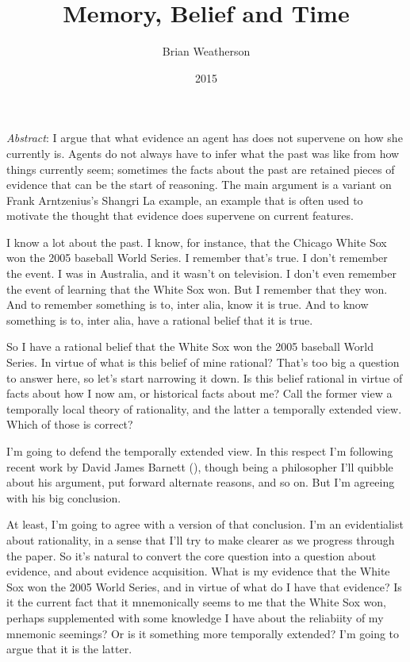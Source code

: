 \documentclass[
  11pt,
  letterpaper,
  DIV=11,
  numbers=noendperiod,
  twoside]{scrartcl}
\title{Memory, Belief and Time}
\author{Brian Weatherson}
\date{2015}
\renewenvironment{abstract}
 {\vspace{-1.25cm}
 \quotation\small\noindent\emph{Abstract}:}
 {\endquotation}
\renewenvironment{abstract}
 {\quotation\small\noindent\emph{Abstract}:}
 {\endquotation\vspace{-0.02cm}}
\begin{document}
\maketitle
\begin{abstract}
I argue that what evidence an agent has does not supervene on how she
currently is. Agents do not always have to infer what the past was like
from how things currently seem; sometimes the facts about the past are
retained pieces of evidence that can be the start of reasoning. The main
argument is a variant on Frank Arntzenius's Shangri La example, an
example that is often used to motivate the thought that evidence does
supervene on current features.
\end{abstract}


I know a lot about the past. I know, for instance, that the Chicago
White Sox won the 2005 baseball World Series. I remember that's true. I
don't remember the event. I was in Australia, and it wasn't on
television. I don't even remember the event of learning that the White
Sox won. But I remember that they won. And to remember something is to,
inter alia, know it is true. And to know something is to, inter alia,
have a rational belief that it is true.

So I have a rational belief that the White Sox won the 2005 baseball
World Series. In virtue of what is this belief of mine rational? That's
too big a question to answer here, so let's start narrowing it down. Is
this belief rational in virtue of facts about how I now am, or
historical facts about me? Call the former view a temporally local
theory of rationality, and the latter a temporally extended view. Which
of those is correct?

I'm going to defend the temporally extended view. In this respect I'm
following recent work by David James Barnett
(), though being a philosopher I'll
quibble about his argument, put forward alternate reasons, and so on.
But I'm agreeing with his big conclusion.

At least, I'm going to agree with a version of that conclusion. I'm an
evidentialist about rationality, in a sense that I'll try to make
clearer as we progress through the paper. So it's natural to convert the
core question into a question about evidence, and about evidence
acquisition. What is my evidence that the White Sox won the 2005 World
Series, and in virtue of what do I have that evidence? Is it the current
fact that it mnemonically seems to me that the White Sox won, perhaps
supplemented with some knowledge I have about the reliabiity of my
mnemonic seemings? Or is it something more temporally extended? I'm
going to argue that it is the latter.
\end{document}
